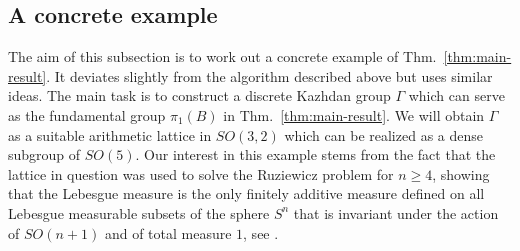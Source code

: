 \documentclass[11pt, letterpaper, oneside,reqno]{amsart}
\theoremstyle{plain}
\theoremstyle{underline}
\theoremstyle{definition}
\theoremstyle{remark}
\begin{document}
	
	
	\color{black}
	
	\subsection{A concrete example}\label{sec:example}
	
	The aim of this subsection is to work out a concrete example of Thm.~\ref{thm:main-result}. It deviates slightly from the algorithm described above but uses similar ideas. The main task is to construct a discrete Kazhdan group $\Gamma$ which can serve as the fundamental group $\pi_1(B)$ in Thm.~\ref{thm:main-result}. We will obtain $\Gamma$ as a suitable arithmetic lattice in $SO(3,2)$ which can be realized as a dense subgroup of $SO(5)$.  Our interest in this example stems from the fact that the lattice in question was used to solve the Ruziewicz problem for $n\geq 4$, showing that the Lebesgue measure is the only finitely additive measure defined on all Lebesgue measurable subsets of the sphere $S^{n}$ that is invariant under the action of $SO(n+1)$ and of total measure $1$, see \cite[Thm.~3.4.2]{Lubotzky}.
	
	
\end{document}
